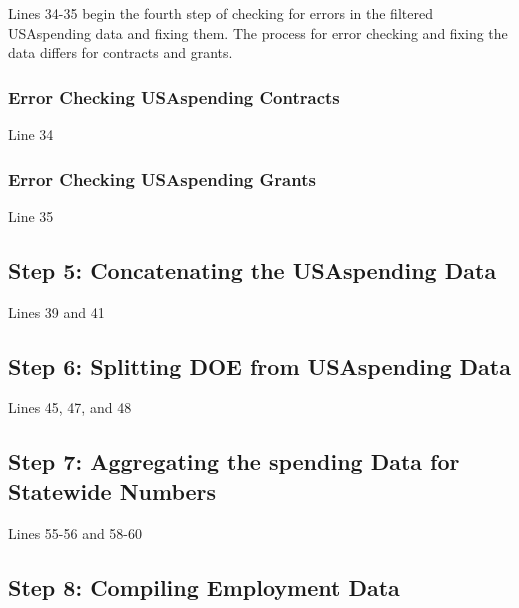 \documentclass[
]{book}
\begin{document}
Lines 34-35 begin the fourth step of checking for errors in the filtered USAspending data and fixing them. The process for error checking and fixing the data differs for contracts and grants.

\hypertarget{error-checking-usaspending-contracts}{%
\subsubsection{Error Checking USAspending Contracts}\label{error-checking-usaspending-contracts}}

Line 34

\hypertarget{error-checking-usaspending-grants}{%
\subsubsection{Error Checking USAspending Grants}\label{error-checking-usaspending-grants}}

Line 35

\hypertarget{step-5-concatenating-the-usaspending-data}{%
\subsection{Step 5: Concatenating the USAspending Data}\label{step-5-concatenating-the-usaspending-data}}

Lines 39 and 41

\hypertarget{step-6-splitting-doe-from-usaspending-data}{%
\subsection{Step 6: Splitting DOE from USAspending Data}\label{step-6-splitting-doe-from-usaspending-data}}

Lines 45, 47, and 48

\hypertarget{step-7-aggregating-the-spending-data-for-statewide-numbers}{%
\subsection{Step 7: Aggregating the spending Data for Statewide Numbers}\label{step-7-aggregating-the-spending-data-for-statewide-numbers}}

Lines 55-56 and 58-60

\hypertarget{step-8-compiling-employment-data}{%
\subsection{Step 8: Compiling Employment Data}\label{step-8-compiling-employment-data}}
\end{document}
